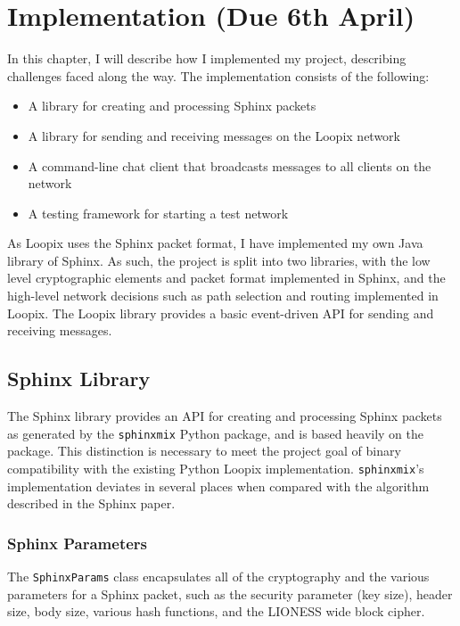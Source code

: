 \documentclass[final,dissertation.tex]{subfiles}
\begin{document}
\chapter{Implementation (Due 6th April)}

In this chapter, I will describe how I implemented my project, describing challenges faced along the way. The implementation consists of the following:

\begin{itemize}
	\item A library for creating and processing Sphinx packets
	\item A library for sending and receiving messages on the Loopix network
	\item A command-line chat client that broadcasts messages to all clients on the network
	\item A testing framework for starting a test network
\end{itemize}

As Loopix uses the Sphinx packet format, I have implemented my own Java library of Sphinx. As such, the project is split into two libraries, with the low level cryptographic elements and packet format implemented in Sphinx, and the high-level network decisions such as path selection and routing implemented in Loopix. The Loopix library provides a basic event-driven API for sending and receiving messages.

\section{Sphinx Library}

The Sphinx library provides an API for creating and processing Sphinx packets as generated by the \verb|sphinxmix| Python package, and is based heavily on the package. This distinction is necessary to meet the project goal of binary compatibility with the existing Python Loopix implementation. \verb|sphinxmix|'s implementation deviates in several places when compared with the algorithm described in the Sphinx paper.

\subsection{Sphinx Parameters}

The \verb|SphinxParams| class encapsulates all of the cryptography and the various parameters for a Sphinx packet, such as the security parameter (key size), header size, body size, various hash functions, and the LIONESS wide block cipher.
\end{document}

